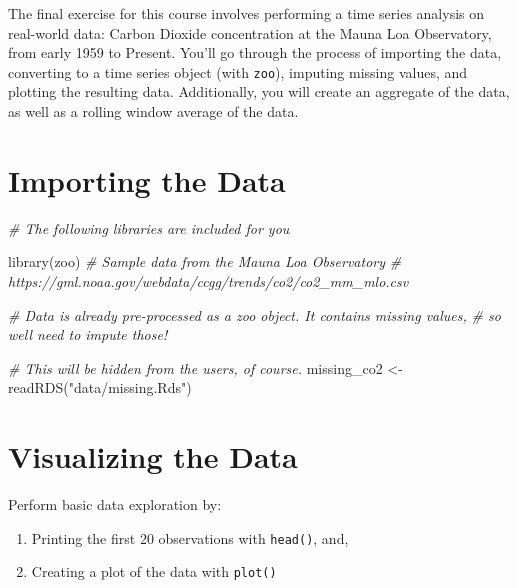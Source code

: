 \documentclass[
]{book}
\newenvironment{Shaded}{\begin{snugshade}}{\end{snugshade}}
\newcommand{\CommentTok}[1]{\textcolor[rgb]{0.56,0.35,0.01}{\textit{#1}}}
\newcommand{\FunctionTok}[1]{\textcolor[rgb]{0.00,0.00,0.00}{#1}}
\newcommand{\NormalTok}[1]{#1}
\newcommand{\OtherTok}[1]{\textcolor[rgb]{0.56,0.35,0.01}{#1}}
\newcommand{\StringTok}[1]{\textcolor[rgb]{0.31,0.60,0.02}{#1}}
\providecommand{\tightlist}{%
  \setlength{\itemsep}{0pt}\setlength{\parskip}{0pt}}
\begin{document}
The final exercise for this course involves performing a time series analysis on real-world data: Carbon Dioxide concentration at the Mauna Loa Observatory, from early 1959 to Present. You'll go through the process of importing the data, converting to a time series object (with \texttt{zoo}), imputing missing values, and plotting the resulting data. Additionally, you will create an aggregate of the data, as well as a rolling window average of the data.

\hypertarget{importing-the-data}{%
\section{Importing the Data}\label{importing-the-data}}

\begin{Shaded}
\begin{Highlighting}[]
\CommentTok{\# The following libraries are included for you}

\FunctionTok{library}\NormalTok{(zoo)}
\CommentTok{\# Sample data from the Mauna Loa Observatory}
\CommentTok{\# https://gml.noaa.gov/webdata/ccgg/trends/co2/co2\_mm\_mlo.csv}

\CommentTok{\# Data is already pre{-}processed as a \textasciigrave{}zoo\textasciigrave{} object. It contains missing values,}
\CommentTok{\# so we\textquotesingle{}ll need to impute those!}

\CommentTok{\# This will be hidden from the users, of course.}
\NormalTok{missing\_co2 }\OtherTok{\textless{}{-}} \FunctionTok{readRDS}\NormalTok{(}\StringTok{"data/missing.Rds"}\NormalTok{)}
\end{Highlighting}
\end{Shaded}

\newpage

\hypertarget{visualizing-the-data}{%
\section{Visualizing the Data}\label{visualizing-the-data}}

Perform basic data exploration by:

\begin{enumerate}
\def\labelenumi{\arabic{enumi}.}
\tightlist
\item
  Printing the first 20 observations with \texttt{head()}, and,
\item
  Creating a plot of the data with \texttt{plot()}
\end{enumerate}
\end{document}
